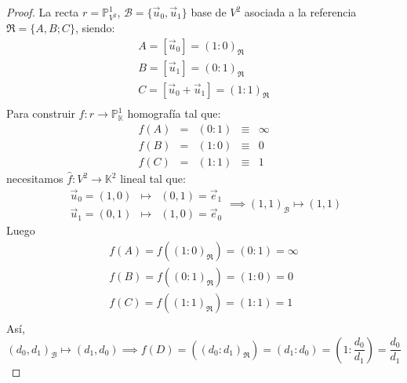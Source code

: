 \begin{proof}
    La recta $r= \mathbb{P}^1_{V^2}$, $\mathcal{B} = \{\vec{u}_0, \vec{u}_1\}$ base de $V^2$ asociada a la referencia $\mathfrak{R} = \{A,B;C\}$, siendo:
    \[
        \begin{matrix}
            A = [\vec{u}_0] = (1:0)_\mathfrak{R} \\
            B = [\vec{u}_1] = (0:1)_\mathfrak{R} \\
            C = [\vec{u}_0 + \vec{u}_1] = (1:1)_\mathfrak{R} \\
        \end{matrix}
    \]
    Para construir $f: r \to \mathbb{P}^1_{\mathbb{K}}$ homografía tal que:
    \[
        \begin{array}{ccccc}
            f(A) & = & (0:1) & \equiv & \infty \\
            f(B) & = & (1:0) & \equiv & 0 \\
            f(C) & = & (1:1) & \equiv & 1
        \end{array}
    \]
    necesitamos $\hat{f}: V^2 \to \mathbb{K}^2$ lineal tal que:
    \[
        \begin{matrix}
            \vec{u}_0 = (1,0) & \mapsto & (0, 1) = \vec{e}_1 \\
            \vec{u}_1 = (0,1) & \mapsto & (1, 0) = \vec{e}_0
        \end{matrix} \implies (1,1)_\mathcal{B} \mapsto (1,1)
    \]
    Luego
    \[
        \begin{matrix}
            f(A) = f((1:0)_\mathfrak{R}) = (0:1) = \infty \\
            f(B) = f((0:1)_\mathfrak{R}) = (1:0) = 0 \\
            f(C) = f((1:1)_\mathfrak{R}) = (1:1) = 1 \\
        \end{matrix}
    \]
    Así,
    \[
        (d_0,d_1)_\mathcal{B} \mapsto (d_1,d_0) \implies f(D) = ((d_0 : d_1)_\mathfrak{R}) = (d_1 : d_0) = (1: \frac{d_0}{d_1}) = \frac{d_0}{d_1}
    \]
\end{proof}

